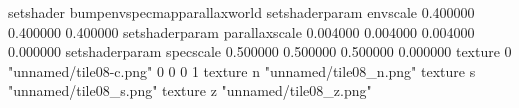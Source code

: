 setshader bumpenvspecmapparallaxworld
setshaderparam envscale 0.400000 0.400000 0.400000
setshaderparam parallaxscale 0.004000 0.004000 0.004000 0.000000
setshaderparam specscale 0.500000 0.500000 0.500000 0.000000
texture 0 "unnamed/tile08-c.png" 0 0 0 1
texture n "unnamed/tile08_n.png"
texture s "unnamed/tile08_s.png"
texture z "unnamed/tile08_z.png"